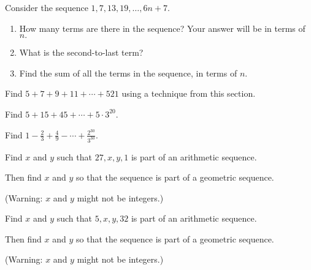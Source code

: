 \documentclass[11pt,]{book}
\theoremstyle{ptxplainnotitle}
\theoremstyle{ptxplaintitle}
\theoremstyle{ptxdefinitionnotitle}
\theoremstyle{ptxdefinitiontitle}
\theoremstyle{ptxdefinitionnotitle}
\theoremstyle{ptxdefinitiontitle}
\theoremstyle{ptxdefinitionnotitle}
\theoremstyle{ptxdefinitiontitle}
\theoremstyle{ptxdefinitiontitlenonumber}
\theoremstyle{ptxdefinitiontitlenonumber}
\numberwithin{equation}{chapter}
\begin{document}
\begin{divisionexercise}{4}\hypertarget{exercise-16}{}
\hypertarget{p-272}{}%
Consider the sequence \(1, 7, 13, 19, \ldots, 6n + 7\text{.}\) \leavevmode%
\begin{enumerate}[label=(\alph*)]
\item\hypertarget{li-158}{}\hypertarget{p-273}{}%
How many terms are there in the sequence?  Your answer will be in terms of \(n\text{.}\)%
\item\hypertarget{li-159}{}\hypertarget{p-275}{}%
What is the second-to-last term?%
\item\hypertarget{li-160}{}\hypertarget{p-277}{}%
Find the sum of all the terms in the sequence, in terms of \(n\text{.}\)%
\end{enumerate}
%
\end{divisionexercise}%
\begin{divisionexercise}{5}\hypertarget{exercise-17}{}
\hypertarget{p-286}{}%
Find \(5 + 7 + 9 + 11+ \cdots + 521\) using a technique from this section.%
\end{divisionexercise}%
\begin{divisionexercise}{6}\hypertarget{exercise-18}{}
\hypertarget{p-292}{}%
Find \(5 + 15 + 45 + \cdots + 5\cdot 3^{20}\text{.}\)%
\end{divisionexercise}%
\begin{divisionexercise}{7}\hypertarget{exercise-19}{}
\hypertarget{p-298}{}%
Find \(1 - \frac{2}{3} + \frac{4}{9} - \cdots + \frac{2^{30}}{3^{30}}\text{.}\)%
\end{divisionexercise}%
\begin{divisionexercise}{8}\hypertarget{exercise-20}{}
\hypertarget{p-305}{}%
Find \(x\) and \(y\) such that \(27, x, y, 1\) is part of an arithmetic sequence.%
\par
\hypertarget{p-306}{}%
Then find \(x\) and \(y\) so that the sequence is part of a geometric sequence.%
\par
\hypertarget{p-307}{}%
(Warning: \(x\) and \(y\) might not be integers.)%
\end{divisionexercise}%
\begin{divisionexercise}{9}\hypertarget{exercise-21}{}
\hypertarget{p-313}{}%
Find \(x\) and \(y\) such that \(5, x, y, 32\) is part of an arithmetic sequence.%
\par
\hypertarget{p-314}{}%
Then find \(x\) and \(y\) so that the sequence is part of a geometric sequence.%
\par
\hypertarget{p-315}{}%
(Warning: \(x\) and \(y\) might not be integers.)%
\end{divisionexercise}%
\end{document}
